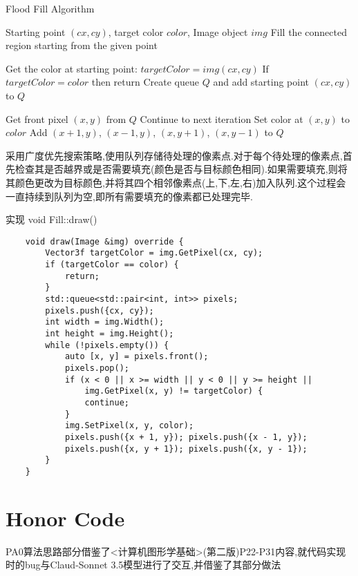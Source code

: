 \documentclass[a4paper,twoside]{article}
\begin{document}
\begin{algorithm}[H]
    \caption{Flood Fill Algorithm}
    \label{alg:flood_fill}
    \begin{algorithmic}[1]
        \REQUIRE Starting point $(cx, cy)$, target color $color$, Image object $img$
        \ENSURE Fill the connected region starting from the given point

        \STATE Get the color at starting point: $targetColor = img(cx, cy)$
        \STATE If $targetColor = color$ then return
        \STATE Create queue $Q$ and add starting point $(cx, cy)$ to $Q$
        
            \STATE Get front pixel $(x, y)$ from $Q$
                \STATE Continue to next iteration
            \ENDIF
            \STATE Set color at $(x, y)$ to $color$
            \STATE Add $(x+1, y)$, $(x-1, y)$, $(x, y+1)$, $(x, y-1)$ to $Q$
        \ENDWHILE
    \end{algorithmic}
\end{algorithm}
采用广度优先搜索策略,使用队列存储待处理的像素点.对于每个待处理的像素点,首先检查其是否越界或是否需要填充(颜色是否与目标颜色相同).如果需要填充,则将其颜色更改为目标颜色,并将其四个相邻像素点(上,下,左,右)加入队列.这个过程会一直持续到队列为空,即所有需要填充的像素都已处理完毕.
\begin{listing}[H]
    \caption{实现 void Fill::draw()}
    \label{code:fill_draw}
    \begin{verbatim}
    void draw(Image &img) override {
        Vector3f targetColor = img.GetPixel(cx, cy);
        if (targetColor == color) {
            return;
        }
        std::queue<std::pair<int, int>> pixels;
        pixels.push({cx, cy});
        int width = img.Width();
        int height = img.Height();
        while (!pixels.empty()) {
            auto [x, y] = pixels.front();
            pixels.pop();
            if (x < 0 || x >= width || y < 0 || y >= height ||
                img.GetPixel(x, y) != targetColor) {
                continue;
            }
            img.SetPixel(x, y, color);
            pixels.push({x + 1, y}); pixels.push({x - 1, y}); 
            pixels.push({x, y + 1}); pixels.push({x, y - 1}); 
        }
    }
    \end{verbatim}
\end{listing}

\section{Honor Code}
PA0算法思路部分借鉴了<计算机图形学基础>(第二版)P22-P31内容,就代码实现时的bug与Claud-Sonnet 3.5模型进行了交互,并借鉴了其部分做法
\end{document}
